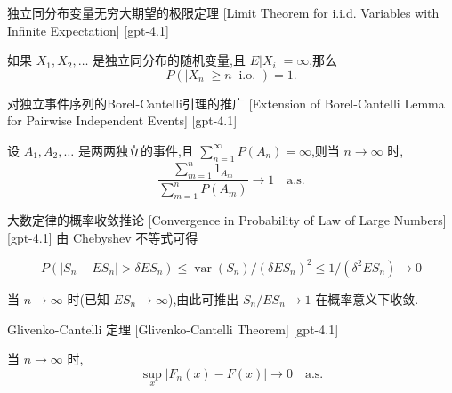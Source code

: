 \documentclass[UTF8]{ctexart}
\begin{document}
    
    
    \begin{thm}
        {独立同分布变量无穷大期望的极限定理}
        [Limit Theorem for i.i.d. Variables with Infinite Expectation]
        [gpt-4.1]
        
如果 $X_1, X_2, \dots$ 是独立同分布的随机变量,且 $E | X_i | = \infty$,那么
\[
P ( | X_n | \geq n \ \text{ i.o. } ) = 1.
\]

    \end{thm}
    
    
    
    \begin{thm}
        {对独立事件序列的Borel-Cantelli引理的推广}
        [Extension of Borel-Cantelli Lemma for Pairwise Independent Events]
        [gpt-4.1]
        
设 $A_1, A_2, \ldots$ 是两两独立的事件,且 $\sum_{n=1}^{\infty} P ( A_n ) = \infty$,则当 $n \to \infty$ 时,
\[
\frac{ \sum_{m=1}^{n} 1_{A_m} }{ \sum_{m=1}^{n} P ( A_m ) } \to 1 \quad \text{a.s.}
\]

    \end{thm}
    
    
    
    \begin{crl}
        {大数定律的概率收敛推论}
        [Convergence in Probability of Law of Large Numbers]
        [gpt-4.1]
        由 Chebyshev 不等式可得

\[
P ( | S_n - E S_n | > \delta E S_n ) \leq \operatorname{var} ( S_n ) / ( \delta E S_n )^2 \leq 1 / ( \delta^2 E S_n ) \to 0
\]

当 $n \to \infty$ 时(已知 $E S_n \to \infty$),由此可推出 $S_n / E S_n \to 1$ 在概率意义下收敛.

    \end{crl}
    
    
    
    \begin{thm}
        {Glivenko-Cantelli 定理}
        [Glivenko-Cantelli Theorem]
        [gpt-4.1]
        
当 $n \to \infty$ 时,
\[
\operatorname{sup}_{x} |F_{n}(x) - F(x)| \to 0 \quad \text{a.s.}
\]

    \end{thm}
    
\end{document}
